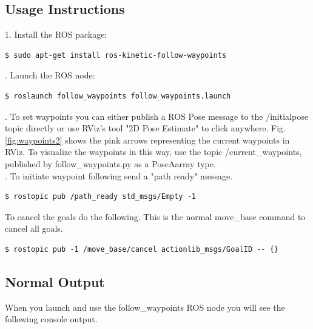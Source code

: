 \documentclass[runningheads,a4paper]{llncs}
\begin{document}
\subsection{Usage Instructions}

1. Install the ROS package:

\begin{lstlisting}[frame=single,basicstyle=\ttfamily\footnotesize]
$ sudo apt-get install ros-kinetic-follow-waypoints
\end{lstlisting}

. Launch the ROS node:

\begin{lstlisting}[frame=single,basicstyle=\ttfamily\footnotesize]
$ roslaunch follow_waypoints follow_waypoints.launch
\end{lstlisting}

. To set waypoints you can either publish a ROS Pose message to the /initialpose topic directly or use RViz's tool "2D Pose Estimate" to click anywhere. Fig. \ref{fig:waypoints2} shows the pink arrows representing the current waypoints in RViz. To visualize the waypoints in this way, use the topic /current\_waypoints, published by follow\_waypoints.py as a PoseAarray type.\\

. To initiate waypoint following send a "path ready" message.

\begin{lstlisting}[frame=single,basicstyle=\ttfamily\footnotesize]
$ rostopic pub /path_ready std_msgs/Empty -1
\end{lstlisting}

\noindent To cancel the goals do the following. This is the normal move\_base command to cancel all goals.

\begin{lstlisting}[frame=single,basicstyle=\ttfamily\footnotesize]
$ rostopic pub -1 /move_base/cancel actionlib_msgs/GoalID -- {}
\end{lstlisting}

\subsection{Normal Output}
When you launch and use the follow\_waypoints ROS node you will see the following console output. 
\end{document}
